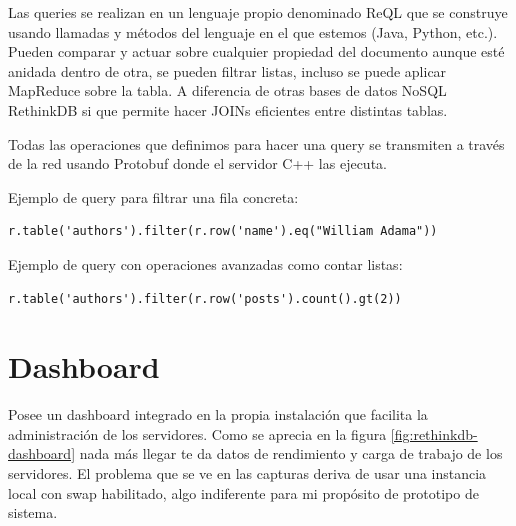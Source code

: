 Las queries se realizan en un lenguaje propio denominado ReQL que se construye usando llamadas y métodos del lenguaje en el que estemos (Java, Python, etc.). Pueden comparar y actuar sobre cualquier propiedad del documento aunque esté anidada dentro de otra, se pueden filtrar listas, incluso se puede aplicar MapReduce\cite{mapreduce} sobre la tabla. A diferencia de otras bases de datos NoSQL RethinkDB si que permite hacer JOINs eficientes entre distintas tablas\cite{reqljoins}.

Todas las operaciones que definimos para hacer una query se transmiten a través de la red usando Protobuf donde el servidor C++ las ejecuta.

Ejemplo de query para filtrar una fila concreta:
\begin{verbatim}
r.table('authors').filter(r.row('name').eq("William Adama"))
\end{verbatim}

Ejemplo de query con operaciones avanzadas como contar listas:
\begin{verbatim}
r.table('authors').filter(r.row('posts').count().gt(2))
\end{verbatim}

\section{Dashboard}

Posee un dashboard integrado en la propia instalación que facilita la administración de los servidores. Como se aprecia en la figura \ref{fig:rethinkdb-dashboard} nada más llegar te da datos de rendimiento y carga de trabajo de los servidores. El problema que se ve en las capturas deriva de usar una instancia local con swap habilitado, algo indiferente para mi propósito de prototipo de sistema.

